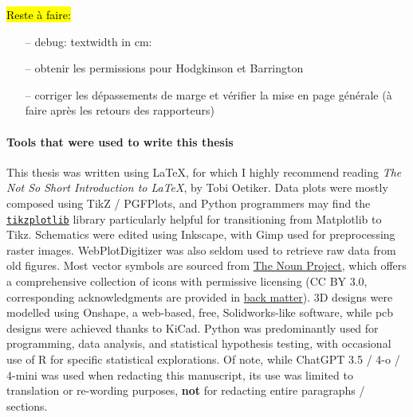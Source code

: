 \vfill

\hl{Reste à faire:}
\begin{enumerate}
	\item[--] debug: textwidth in cm: \prntlen{\textwidth}
	\item[--] obtenir les permissions pour Hodgkinson et Barrington
	\item[--] corriger les dépassements de marge et vérifier la mise en page générale (à faire après les retours des rapporteurs)
\end{enumerate}

\vfill
\setcounter{secnumdepth}{3}

\paragraph{Tools that were used to write this thesis} \hphantom{text}

This thesis was written using \LaTeX{}, for which I highly recommend reading \emph{The Not So Short Introduction to \LaTeX}, by Tobi Oetiker\cite{oetiker2007}. Data plots were mostly composed using TikZ / PGFPlots, and Python programmers may find the \href{https://web.archive.org/web/20240506065201/https://pypi.org/project/tikzplotlib/}{\texttt{tikzplotlib}} library particularly helpful for transitioning from Matplotlib to Tikz. Schematics were edited using Inkscape, with Gimp used for preprocessing raster images. WebPlotDigitizer was also seldom used to retrieve raw data from old figures. Most vector symbols are sourced from \href{https://web.archive.org/web/20240505215016/https://thenounproject.com/}{The Noun Project}, which offers a comprehensive collection of icons with permissive licensing (CC BY 3.0, corresponding acknowledgments are provided in \hyperref[chap:add_ack]{back matter}). 3D designs were modelled using Onshape, a web-based, free, Solidworks-like software, while \gls{pcb} designs were achieved thanks to KiCad. Python was predominantly used for programming, data analysis, and statistical hypothesis testing, with occasional use of R for specific statistical explorations. Of note, while ChatGPT 3.5 / 4-o / 4-mini was used when redacting this manuscript, its use was limited to translation or re-wording purposes, \textbf{not} for redacting entire paragraphs / sections.

\setcounter{secnumdepth}{4}